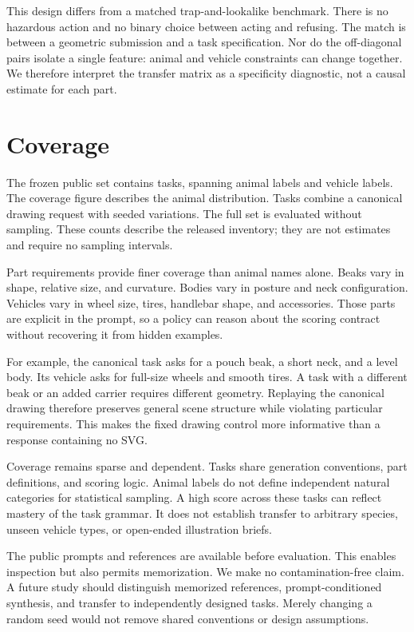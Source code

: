 \documentclass{article}
\begin{document}
This design differs from a matched trap-and-lookalike benchmark. There is no hazardous action and no binary choice between acting and refusing. The match is between a geometric submission and a task specification. Nor do the off-diagonal pairs isolate a single feature: animal and vehicle constraints can change together. We therefore interpret the transfer matrix as a specificity diagnostic, not a causal estimate for each part.

\section{Coverage}
The frozen public set contains \taskCount{} tasks, spanning \animalCount{} animal labels and \vehicleCount{} vehicle labels. The coverage figure describes the animal distribution. Tasks combine a canonical drawing request with seeded variations. The full set is evaluated without sampling. These counts describe the released inventory; they are not estimates and require no sampling intervals.


Part requirements provide finer coverage than animal names alone. Beaks vary in shape, relative size, and curvature. Bodies vary in posture and neck configuration. Vehicles vary in wheel size, tires, handlebar shape, and accessories. Those parts are explicit in the prompt, so a policy can reason about the scoring contract without recovering it from hidden examples.

For example, the canonical task asks for a pouch beak, a short neck, and a level body. Its vehicle asks for full-size wheels and smooth tires. A task with a different beak or an added carrier requires different geometry. Replaying the canonical drawing therefore preserves general scene structure while violating particular requirements. This makes the fixed drawing control more informative than a response containing no SVG.

Coverage remains sparse and dependent. Tasks share generation conventions, part definitions, and scoring logic. Animal labels do not define independent natural categories for statistical sampling. A high score across these tasks can reflect mastery of the task grammar. It does not establish transfer to arbitrary species, unseen vehicle types, or open-ended illustration briefs.

The public prompts and references are available before evaluation. This enables inspection but also permits memorization. We make no contamination-free claim. A future study should distinguish memorized references, prompt-conditioned synthesis, and transfer to independently designed tasks. Merely changing a random seed would not remove shared conventions or design assumptions.
\end{document}

